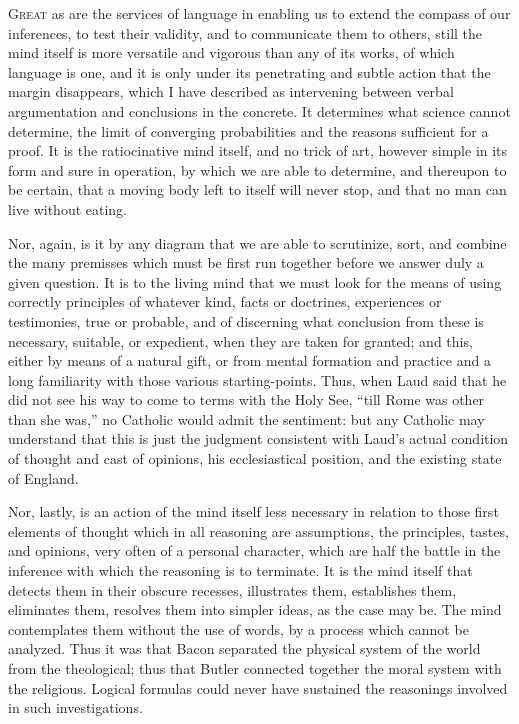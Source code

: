 
G\textsc{reat} as are the services of language in enabling us to extend the
compass of our inferences, to test their validity, and to communicate
them to others, still the mind itself is more versatile and vigorous
than any of its works, of which language is one, and it is only under
its penetrating and subtle action that the margin disappears, which I
have described as intervening between verbal argumentation and
conclusions in the concrete. It determines what science cannot
determine, the limit of converging probabilities and the reasons
sufficient for a proof. It is the ratiocinative mind itself, and no
trick of art, however simple in its form and sure in operation, by
which we are able to determine, and thereupon to be certain, that a
moving body left to itself will never stop, and that no man can live
without eating.

Nor, again, is it by any diagram that we are able to scrutinize,
sort, and combine the many premisses which must be first run together
before we answer duly a given question. It is to the living mind that
we must look for the means of using correctly principles of whatever
kind, facts or doctrines, experiences or testimonies, true or
probable, and of discerning what conclusion from these is
necessary, suitable, or expedient, when they are taken for granted;
and this, either by means of a natural gift, or from mental formation
and practice and a long familiarity with those various
starting-points. Thus, when Laud said that he did not see his way to
come to terms with the Holy See, ``till Rome was other than she
was,'' no Catholic would admit the sentiment: but any Catholic may
understand that this is just the judgment consistent with Laud's
actual condition of thought and cast of opinions, his ecclesiastical
position, and the existing state of England.

Nor, lastly, is an action of the mind itself less necessary in
relation to those first elements of thought which in all reasoning are
assumptions, the principles, tastes, and opinions, very often of a
personal character, which are half the battle in the inference with
which the reasoning is to terminate. It is the mind itself that
detects them in their obscure recesses, illustrates them, establishes
them, eliminates them, resolves them into simpler ideas, as the case
may be. The mind contemplates them without the use of words, by a
process which cannot be analyzed. Thus it was that Bacon separated the
physical system of the world from the theological; thus that Butler
connected together the moral system with the religious. Logical
formulas could never have sustained the reasonings involved in such
investigations.

